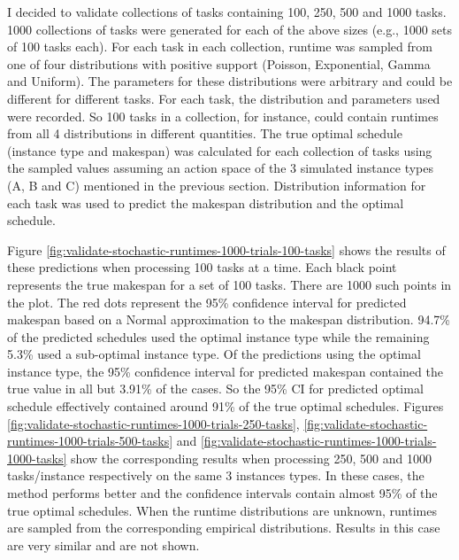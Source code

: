 \documentclass[12pt]{report}
\begin{document}
I decided to validate collections of tasks containing 100, 250, 500 and 1000 tasks. 
1000 collections of tasks were generated for each of the above sizes (e.g., 1000 sets of 100 tasks each).
For each task in each collection, runtime was sampled from one of four distributions with positive support (Poisson, Exponential, Gamma and Uniform).
The parameters for these distributions were arbitrary and could be different for different tasks.
For each task, the distribution and parameters used were recorded.
So 100 tasks in a collection, for instance, could contain runtimes from all 4 distributions in different quantities.
The true optimal schedule (instance type and makespan) was calculated for each collection of tasks using the sampled values assuming an action space of the 3 simulated instance types (A, B and C) mentioned in the previous section.
Distribution information for each task was used to predict the makespan distribution and the optimal schedule.

Figure \ref{fig:validate-stochastic-runtimes-1000-trials-100-tasks} shows the results of these predictions when processing 100 tasks at a time.
Each black point represents the true makespan for a set of 100 tasks.
There are 1000 such points in the plot.
The red dots represent the 95\% confidence interval for predicted makespan based on a Normal approximation to the makespan distribution.
94.7\% of the predicted schedules used the optimal instance type while the remaining 5.3\% used a sub-optimal instance type.
Of the predictions using the optimal instance type, the 95\% confidence interval for predicted makespan contained the true value in all but 3.91\% of the cases.
So the 95\% CI for predicted optimal schedule effectively contained around 91\% of the true optimal schedules.
Figures \ref{fig:validate-stochastic-runtimes-1000-trials-250-tasks}, \ref{fig:validate-stochastic-runtimes-1000-trials-500-tasks} and \ref{fig:validate-stochastic-runtimes-1000-trials-1000-tasks} show the corresponding results when processing 250, 500 and 1000 tasks/instance respectively on the same 3 instances types. 
In these cases, the method performs better and the confidence intervals contain almost 95\% of the true optimal schedules.
When the runtime distributions are unknown, runtimes are sampled from the corresponding empirical distributions. 
Results in this case are very similar and are not shown.
\end{document}
